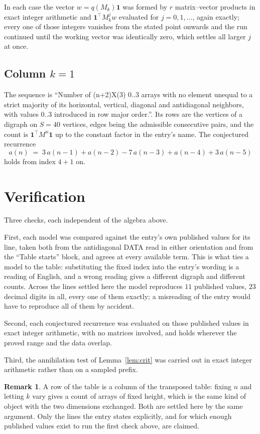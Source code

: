 \documentclass[11pt,a4paper]{article}
\theoremstyle{plain}
\theoremstyle{definition}
\newtheorem{remark}[theorem]{Remark}
\begin{document}
In each case the vector $w=q(M_k)\mathbf{1}$ was formed by $r$ matrix--vector products in
exact integer arithmetic and $\mathbf{1}^{\!\top}M_k^{j}w$ evaluated for $j=0,1,\dots$,
again exactly; every one of those integers vanishes from the stated point onwards and the run
continued until the working vector was identically zero, which settles all larger $j$ at once.

\subsection*{Column $k$$=1$}
The sequence is ``Number of (n+2)X(3) 0..3 arrays with no element unequal to a strict majority of its horizontal, vertical, diagonal and antidiagonal neighbors, with values 0..3 introduced in row major order.''. Its rows are the vertices of a digraph on
$S=40$ vertices, edges being the admissible consecutive pairs, and the count is
$\mathbf{1}^{\!\top}M^{n}\mathbf{1}$ up to the constant factor in the entry's name.
The conjectured recurrence
\[
a(n)\;=\;3\,a(n-1) + a(n-2) - 7\,a(n-3) + a(n-4) + 3\,a(n-5)
\]
holds from index $4+1$ on.

\section{Verification}

Three checks, each independent of the algebra above.

First, each model was compared against the entry's own published values for its line, taken
both from the antidiagonal DATA read in either orientation and from the ``Table starts''
block, and agrees at every available term. This is what ties a model to the table:
substituting the fixed index into the entry's wording is a reading of English, and a wrong
reading gives a different digraph and different counts. Across the lines settled here the
model reproduces $11$ published values, $23$ decimal digits in all, every one of
them exactly; a misreading of the entry would have to reproduce all of them by accident.

Second, each conjectured recurrence was evaluated on those published values in exact
integer arithmetic, with no matrices involved, and holds wherever the proved range and the
data overlap.

Third, the annihilation test of Lemma~\ref{lem:crit} was carried out in exact integer
arithmetic rather than on a sampled prefix.

\begin{remark}
A row of the table is a column of the transposed table: fixing $n$ and letting $k$ vary gives a
count of arrays of fixed height, which is the same kind of object with the two dimensions
exchanged. Both are settled here by the same argument. Only the lines the entry states
explicitly, and for which enough published values exist to run the first check above, are
claimed.
\end{remark}
\end{document}
